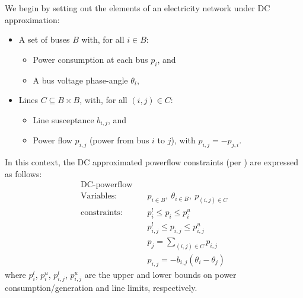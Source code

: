 \documentclass[
10pt, %
a4paper, %
oneside, %
headinclude,footinclude, %
BCOR5mm, %
]{scrartcl}
\begin{document}
We begin by setting out the elements of an electricity network under DC approximation:
\begin{itemize}
    \item A set of buses $B$ with, for all $i\in B$:
    \begin{itemize} 
        \item Power consumption at each bus $p_i$, and 
        \item A bus voltage phase-angle $\theta_i$,
    \end{itemize}
    \item Lines $C\subseteq B\times B$, with, for all $(i,j)\in C$: 
        \begin{itemize} 
        \item Line susceptance $b_{i,j}$, and 
        \item Power flow $p_{i,j}$ (power from bus $i$ to $j$), with $p_{i,j}=-p_{j,i}$. 
    \end{itemize}
\end{itemize}
In this context, the DC approximated powerflow constraints (per \cite{Wang1}) are expressed as follows:
\begin{equation}
\label{dcopf1}
\begin{aligned}
\text{DC-powerflow} \quad& \\
\text{Variables:} \quad&  p_{i\in B},\ \theta_{i\in B},\ p_{(i,j)\in C} \\
\text{constraints:} \quad& p_i^{l}\le p_i \le p_i^{u} \\
&p_{i,j}^l \le p_{i,j} \le p_{i,j}^u \\
&p_j = \sum_{(i,j)\in C}p_{i,j}\\
&p_{i,j} = -b_{i,j}(\theta_i - \theta_j)
\end{aligned}
\end{equation}
where $p_i^{l}$, $p_i^{u}$, $p_{i,j}^l$, $p_{i,j}^u$ are the upper and lower bounds on power consumption/generation and line limits, respectively.
\end{document}
